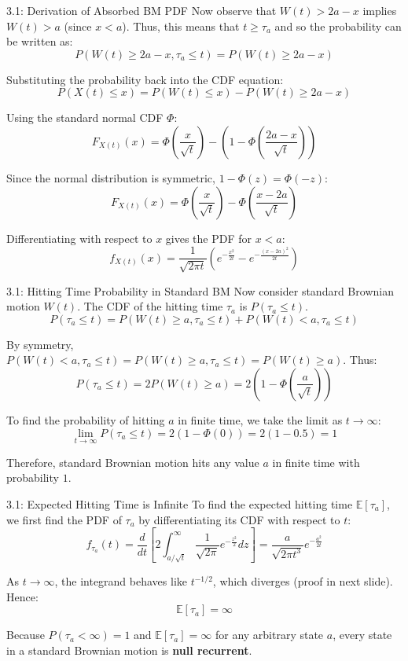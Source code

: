 \documentclass{beamer}
\begin{document}
	\begin{frame}{3.1: Derivation of Absorbed BM PDF}
		Now observe that $W(t) > 2a-x$ implies $W(t) > a$ (since $x<a$). Thus, this means that $t \ge \tau_a$ and so the probability can be written as:
		$$P(W(t) \ge 2a - x, \tau_a \le t) = P(W(t) \ge 2a - x)$$
		
		Substituting the probability back into the CDF equation:
		$$P(X(t) \le x) = P(W(t) \le x) - P(W(t) \ge 2a - x)$$
		
		Using the standard normal CDF $\Phi$:
		$$F_{X(t)}(x) = \Phi\left(\frac{x}{\sqrt{t}}\right) - \left(1 - \Phi\left(\frac{2a - x}{\sqrt{t}}\right)\right)$$
		
		Since the normal distribution is symmetric, $1 - \Phi(z) = \Phi(-z)$:
		$$F_{X(t)}(x) = \Phi\left(\frac{x}{\sqrt{t}}\right) - \Phi\left(\frac{x - 2a}{\sqrt{t}}\right)$$
		
		Differentiating with respect to $x$ gives the PDF for $x < a$:
		$$f_{X(t)}(x) = \frac{1}{\sqrt{2\pi t}} \left( e^{-\frac{x^2}{2t}} - e^{-\frac{(x - 2a)^2}{2t}} \right)$$
	\end{frame}
	
	\begin{frame}{3.1: Hitting Time Probability in Standard BM}
		Now consider standard Brownian motion $W(t)$. The CDF of the hitting time $\tau_a$ is $P(\tau_a \le t)$.
		$$P(\tau_a \le t) = P(W(t) \ge a, \tau_a \le t) + P(W(t) < a, \tau_a \le t)$$
		
		By symmetry, $P(W(t) < a, \tau_a \le t) = P(W(t) \ge a, \tau_a \le t) = P(W(t) \ge a)$. Thus:
		$$P(\tau_a \le t) = 2P(W(t) \ge a) = 2 \left( 1 - \Phi\left(\frac{a}{\sqrt{t}}\right) \right)$$
		
		To find the probability of hitting $a$ in finite time, we take the limit as $t \to \infty$:
		$$\lim_{t \to \infty} P(\tau_a \le t) = 2 \left( 1 - \Phi(0) \right) = 2(1 - 0.5) = 1$$
		
		Therefore, standard Brownian motion hits any value $a$ in finite time with probability $1$.
	\end{frame}
	
	\begin{frame}{3.1: Expected Hitting Time is Infinite}
		To find the expected hitting time $\mathbb{E}[\tau_a]$, we first find the PDF of $\tau_a$ by differentiating its CDF with respect to $t$:
		$$f_{\tau_a}(t) = \frac{d}{dt} \left[ 2 \int_{a/\sqrt{t}}^{\infty} \frac{1}{\sqrt{2\pi}} e^{-\frac{z^2}{2}} dz \right] = \frac{a}{\sqrt{2\pi t^3}} e^{-\frac{a^2}{2t}}$$
		
		As $t \to \infty$, the integrand behaves like $t^{-1/2}$, which diverges (proof in next slide). Hence:
		$$\mathbb{E}[\tau_a] = \infty$$
		
		Because $P(\tau_a < \infty) = 1$ and $\mathbb{E}[\tau_a] = \infty$ for any arbitrary state $a$, every state in a standard Brownian motion is \textbf{null recurrent}.
	\end{frame}
	
\end{document}
